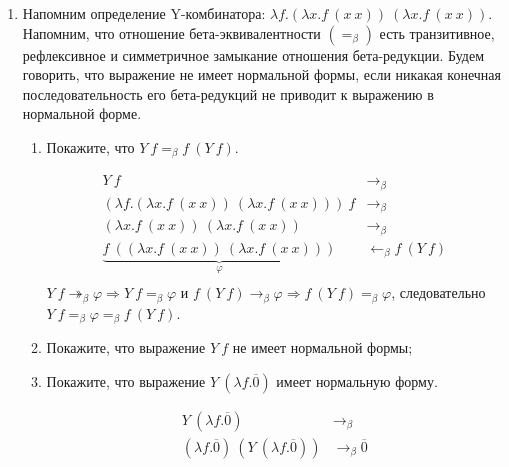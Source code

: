 \begin{enumerate}
    \item Напомним определение Y-комбинатора: $\lambda f.(\lambda x.f\ (x\ x))\ (\lambda x.f\ (x\ x))$.
          Напомним, что отношение бета-эквивалентности $(=_\beta)$ есть транзитивное, рефлексивное и симметричное
          замыкание отношения бета-редукции. Будем говорить, что выражение не имеет нормальной формы, если
          никакая конечная последовательность его бета-редукций не приводит к выражению в нормальной форме.
          \begin{enumerate}
              \item Покажите, что $Y\ f =_\beta f\ (Y\ f)$.
                    \begin{solution}
                        \begin{align*}
                            Y\ f                                                                     & \to_\beta                    \\
                            (\lambda f.(\lambda x.f\ (x\ x))\ (\lambda x.f\ (x\ x)))\ f              & \to_\beta                    \\
                            (\lambda x.f\ (x\ x))\ (\lambda x.f\ (x\ x))                             & \to_\beta                    \\
                            \underbrace{f\ ((\lambda x.f\ (x\ x))\ (\lambda x.f\ (x\ x)))}_{\varphi} & \leftarrow_\beta   f\ (Y\ f) \\
                        \end{align*}
                        \(Y\ f \twoheadrightarrow_\beta \varphi \Rightarrow Y\ f =_\beta \varphi\) и \(f\ (Y\ f) \to_\beta \varphi \Rightarrow f\ (Y\ f) =_\beta \varphi\), следовательно \(Y\ f =_\beta \varphi = _\beta f\ (Y\ f)\).
                    \end{solution}
              \item Покажите, что выражение $Y\ f$ не имеет нормальной формы;
              \item Покажите, что выражение $Y\ (\lambda f.\overline{0})$ имеет нормальную форму.
                    \begin{solution}
                        \begin{align*}
                            Y\ (\lambda f.\overline{0})                             & \to_\beta              \\
                            (\lambda f.\overline{0})\ (Y\ (\lambda f.\overline{0})) & \to_\beta \overline{0} \\
                        \end{align*}

\end{solution}
\end{enumerate}
\end{enumerate}
